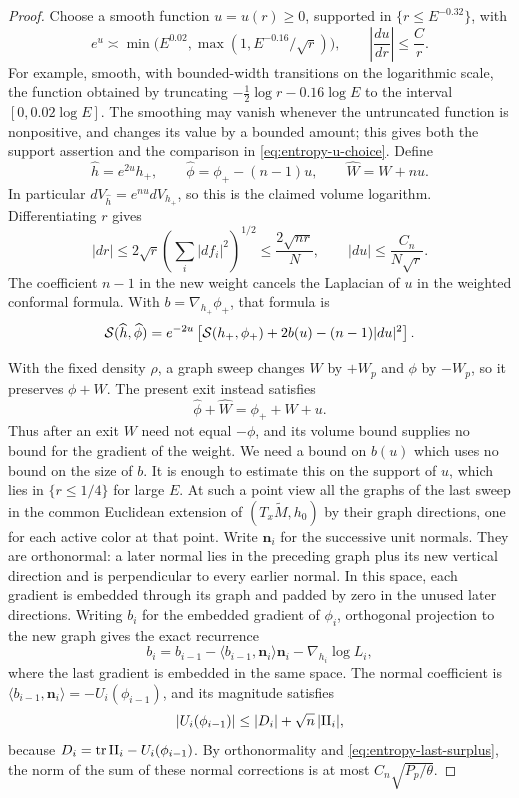 \begin{proof}
Choose a smooth function \(u=u(r)\geq0\), supported in
\(\{r\leq E^{-0.32}\}\), with
\begin{equation}\label{eq:entropy-u-choice}
 e^u\asymp
 \min\bigl(E^{0.02},\max(1,E^{-0.16}/\sqrt r)\bigr),
 \qquad \left|\frac{du}{dr}\right|\leq\frac C r.
\end{equation}
For example, smooth, with bounded-width transitions on the logarithmic
scale, the function obtained by truncating
\(-\tfrac12\log r-0.16\log E\) to the interval
\([0,0.02\log E]\).  The smoothing may vanish whenever the untruncated
function is nonpositive, and changes its value by a bounded amount;
this gives both the support assertion and the comparison in
\eqref{eq:entropy-u-choice}.  Define
\[
 \widehat h=e^{2u}h_+,\qquad
 \widehat\phi=\phi_+-(n-1)u,\qquad
 \widehat W=W+nu.
\]
In particular \(dV_{\widehat h}=e^{nu}dV_{h_+}\), so this is the
claimed volume logarithm.  Differentiating \(r\) gives
\[
 |dr|\leq2\sqrt r\left(\sum_i|df_i|^2\right)^{1/2}
       \leq\frac{2\sqrt{nr}}N,\qquad
 |du|\leq\frac{C_n}{N\sqrt r}.
\]
The coefficient \(n-1\) in the new weight cancels the Laplacian of
\(u\) in the weighted conformal formula.  With
\(b=\nabla_{h_+}\phi_+\), that formula is
\begin{equation}\label{eq:entropy-conformal-exit}
 \mathcal S(\widehat h,\widehat\phi)
 =e^{-2u}\left[\mathcal S(h_+,\phi_+)+2b(u)-(n-1)|du|^2\right].
\end{equation}

With the fixed density \(\rho\), a graph sweep changes \(W\) by
\(+W_p\) and \(\phi\) by \(-W_p\), so it preserves \(\phi+W\).
The present exit instead satisfies
\[
 \widehat\phi+\widehat W=\phi_++W+u.
\]
Thus after an exit \(W\) need not equal \(-\phi\), and its volume
bound supplies no bound for the gradient of the weight.  We need a
bound on \(b(u)\) which uses no bound on the size of \(b\).
It is enough to estimate this on the support of \(u\), which lies in
\(\{r\leq1/4\}\) for large \(E\).  At such a point view all the graphs
of the last sweep in the common
Euclidean extension of \((T_x\widetilde M,h_0)\) by their graph
directions, one for each active color at that point.  Write
\(\mathbf n_i\) for the successive unit normals.  They are
orthonormal: a later
normal lies in the preceding graph plus its new vertical direction
and is perpendicular to every earlier normal.  In this space, each
gradient is embedded through its graph and padded by zero in the
unused later directions.  Writing \(b_i\) for the embedded gradient
of \(\phi_i\), orthogonal projection to the new graph gives the exact
recurrence
\[
 b_i=b_{i-1}-\langle b_{i-1},\mathbf n_i\rangle\mathbf n_i
             -\nabla_{h_i}\log L_i,
\]
where the last gradient is embedded in the same space.  The normal
coefficient is
\(\langle b_{i-1},\mathbf n_i\rangle=-U_i(\phi_{i-1})\), and
its magnitude satisfies
\[
 |U_i(\phi_{i-1})|\leq |D_i|+\sqrt n\,|\mathrm{II}_i|,
\]
because \(D_i=\operatorname{tr}\mathrm{II}_i-U_i(\phi_{i-1})\).
By orthonormality and \eqref{eq:entropy-last-surplus}, the norm of
the sum of these normal corrections is at most
\(C_n\sqrt{P_p/\theta}\).


\end{proof}
